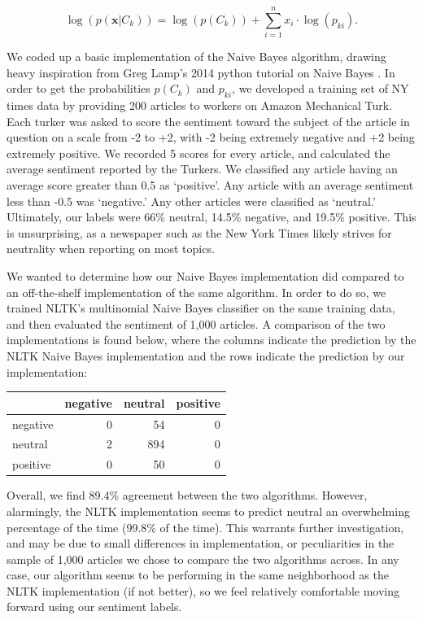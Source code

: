 \documentclass[fleqn,12pt]{SelfArx} %
\begin{document}
\begin{equation}
\log(p(\mathbf{x}|C_k)) = \log ( p(C_k)) + \sum_{i=1}^n x_i \cdot \log(p_{ki}).
\end{equation}

We coded up a basic implementation of the Naive Bayes algorithm, drawing heavy inspiration from Greg Lamp's 2014 python tutorial on Naive Bayes \cite{NaiveBayes}. In order to get the probabilities $p(C_k)$ and $p_{ki}$, we developed a training set of NY times data by providing 200 articles to workers on Amazon Mechanical Turk. Each turker was asked to score the sentiment toward the subject of the article in question on a scale from -2 to +2, with -2 being extremely negative and +2 being extremely positive. We recorded 5 scores for every article, and calculated the average sentiment reported by the Turkers. We classified any article having an average score greater than 0.5 as `positive'. Any article with an average sentiment less than -0.5 was `negative.' Any other articles were classified as `neutral.' Ultimately, our labels were 66\% neutral, 14.5\% negative, and 19.5\% positive. This is unsurprising, as a newspaper such as the New York Times likely strives for neutrality when reporting on most topics.

We wanted to determine how our Naive Bayes implementation did compared to an off-the-shelf implementation of the same algorithm. In order to do so, we trained NLTK's multinomial Naive Bayes classifier on the same training data, and then evaluated the sentiment of 1,000 articles. A comparison of the two implementations is found below, where the columns indicate the prediction by the NLTK Naive Bayes implementation and the rows indicate the prediction by our implementation:

\vspace{10 mm}

\begin{tabular}{l | r r r}
\toprule
  & negative & neutral & positive\\
\midrule
negative & 0 & 54 & 0\\
neutral & 2 & 894 & 0\\
positive & 0 & 50 & 0\\
\bottomrule
\end{tabular}

\vspace{10 mm}

Overall, we find 89.4\% agreement between the two algorithms. However, alarmingly, the NLTK implementation seems to predict neutral an overwhelming percentage of the time (99.8\% of the time). This warrants further investigation, and may be due to small differences in implementation, or peculiarities in the sample of 1,000 articles we chose to compare the two algorithms across. In any case, our algorithm seems to be performing in the same neighborhood as the NLTK implementation (if not better), so we feel relatively comfortable moving forward using our sentiment labels.
\end{document}
